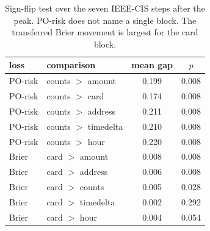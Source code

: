 \begin{table}[t]
\centering
\caption{Sign-flip test over the seven IEEE-CIS steps after the peak. PO-risk does not name a single block. The transferred Brier movement is largest for the card block.}
\label{tab:pathway-ieee-sign}
\begin{tabular}{llcc}
\toprule
loss & comparison & mean gap & $p$ \\
\midrule
PO-risk & counts $>$ amount & 0.199 & 0.008 \\
PO-risk & counts $>$ card & 0.174 & 0.008 \\
PO-risk & counts $>$ address & 0.211 & 0.008 \\
PO-risk & counts $>$ timedelta & 0.210 & 0.008 \\
PO-risk & counts $>$ hour & 0.220 & 0.008 \\
Brier & card $>$ amount & 0.008 & 0.008 \\
Brier & card $>$ address & 0.006 & 0.008 \\
Brier & card $>$ counts & 0.005 & 0.028 \\
Brier & card $>$ timedelta & 0.002 & 0.292 \\
Brier & card $>$ hour & 0.004 & 0.054 \\
\bottomrule
\end{tabular}
\end{table}

\begin{table}[t]
\centering
\caption{MovieLens-1M, seven calendar days after a peak in the high-rating rate. Rating is the outcome. Shares use absolute movement.}
\label{tab:movielens-path}
\small
{}
\end{table}

